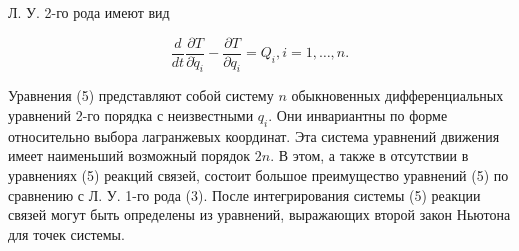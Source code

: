 \documentclass[10pt]{article}
\begin{document}
Л. У. 2-го рода имеют вид



\[

\frac{d}{d t} \frac{\partial T}{\partial \dot{q}_{i}}-\frac{\partial T}{\partial q_{i}}=Q_{i}, i=1, \ldots, n .

\]



Уравнения (5) представляют собой систему $n$ обыкновенных дифференциальных уравнений 2-го порядка с неизвестными $q_{i}$. Они инвариантны по форме относительно выбора лагранжевых координат. Эта система уравнений движения имеет наименьший возможный порядок $2 n$. В этом, а также в отсутствии в уравнениях (5) реакций связей, состоит большое преимущество уравнений (5) по сравнению с Л. У. 1-го рода (3). После интегрирования системы (5) реакции связей могут быть определены из уравнений, выражающих второй закон Ньютона для точек системы.
\end{document}
